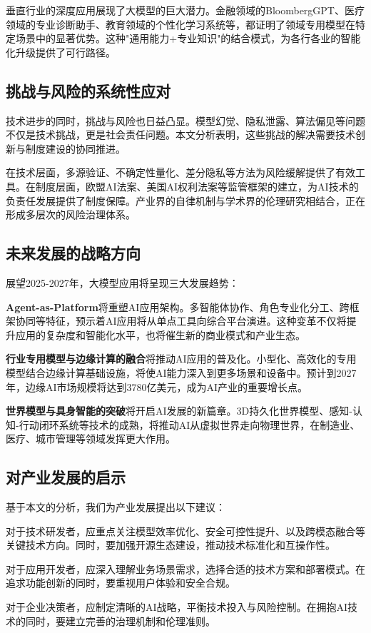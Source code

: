 \documentclass{article}
\begin{document}
垂直行业的深度应用展现了大模型的巨大潜力。金融领域的BloombergGPT、医疗领域的专业诊断助手、教育领域的个性化学习系统等，都证明了领域专用模型在特定场景中的显著优势。这种"通用能力+专业知识"的结合模式，为各行各业的智能化升级提供了可行路径。

\subsection{挑战与风险的系统性应对}
技术进步的同时，挑战与风险也日益凸显。模型幻觉、隐私泄露、算法偏见等问题不仅是技术挑战，更是社会责任问题。本文分析表明，这些挑战的解决需要技术创新与制度建设的协同推进。

在技术层面，多源验证、不确定性量化、差分隐私等方法为风险缓解提供了有效工具。在制度层面，欧盟AI法案、美国AI权利法案等监管框架的建立，为AI技术的负责任发展提供了制度保障。产业界的自律机制与学术界的伦理研究相结合，正在形成多层次的风险治理体系。

\subsection{未来发展的战略方向}
展望2025-2027年，大模型应用将呈现三大发展趋势：

\textbf{Agent-as-Platform}将重塑AI应用架构。多智能体协作、角色专业化分工、跨框架协同等特征，预示着AI应用将从单点工具向综合平台演进。这种变革不仅将提升应用的复杂度和智能化水平，也将催生新的商业模式和产业生态。

\textbf{行业专用模型与边缘计算的融合}将推动AI应用的普及化。小型化、高效化的专用模型结合边缘计算基础设施，将使AI能力深入到更多场景和设备中。预计到2027年，边缘AI市场规模将达到3780亿美元，成为AI产业的重要增长点。

\textbf{世界模型与具身智能的突破}将开启AI发展的新篇章。3D持久化世界模型、感知-认知-行动闭环系统等技术的成熟，将推动AI从虚拟世界走向物理世界，在制造业、医疗、城市管理等领域发挥更大作用。

\subsection{对产业发展的启示}
基于本文的分析，我们为产业发展提出以下建议：

对于技术研发者，应重点关注模型效率优化、安全可控性提升、以及跨模态融合等关键技术方向。同时，要加强开源生态建设，推动技术标准化和互操作性。

对于应用开发者，应深入理解业务场景需求，选择合适的技术方案和部署模式。在追求功能创新的同时，要重视用户体验和安全合规。

对于企业决策者，应制定清晰的AI战略，平衡技术投入与风险控制。在拥抱AI技术的同时，要建立完善的治理机制和伦理准则。
\end{document}
